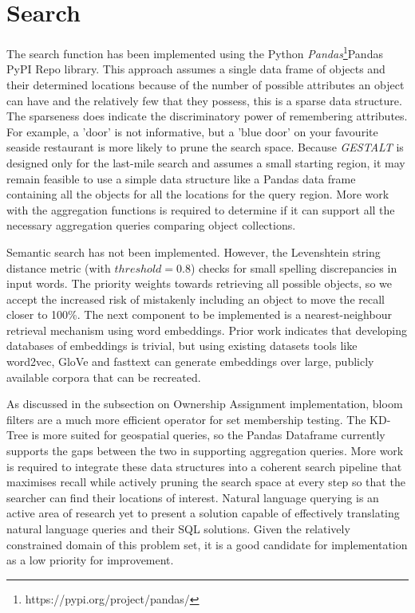 \section{Search}
\label{section:search}

The search function has been implemented using the Python \textit{Pandas}\footnote{https://pypi.org/project/pandas/}{Pandas PyPI Repo} library. 
This approach assumes a single data frame of objects and their determined locations because of the number of possible attributes an object can have and the relatively few that they possess, this is a sparse data structure. 
The sparseness does indicate the discriminatory power of remembering attributes. For example, a 'door' is not informative, but a 'blue door' on your favourite seaside restaurant is more likely to prune the search space. 
Because \textit{GESTALT} is designed only for the last-mile search and assumes a small starting region, it may remain feasible to use a simple data structure like a Pandas data frame containing all the objects for all the locations for the query region. 
More work with the aggregation functions is required to determine if it can support all the necessary aggregation queries comparing object collections. 

Semantic search has not been implemented. However, the Levenshtein string distance metric (with $threshold = 0.8$) checks for small spelling discrepancies in input words. The priority weights towards retrieving all possible objects, so we accept the increased risk of mistakenly including an object to move the recall closer to 100\%. The next component to be implemented is a nearest-neighbour retrieval mechanism using word embeddings. Prior work indicates that developing databases of embeddings is trivial\cite{Mueller2012}, but using existing datasets tools like word2vec, GloVe and fasttext can generate embeddings over large, publicly available corpora that can be recreated. 

As discussed in the subsection on Ownership Assignment implementation, bloom filters are a much more efficient operator for set membership testing. 
The KD-Tree is more suited for geospatial queries, so the Pandas Dataframe currently supports the gaps between the two in supporting aggregation queries. More work is required to integrate these data structures into a coherent search pipeline that maximises recall while actively pruning the search space at every step so that the searcher can find their locations of interest. Natural language querying is an active area of research yet to present a solution capable of effectively translating natural language queries and their SQL solutions. Given the relatively constrained domain of this problem set, it is a good candidate for implementation as a low priority for improvement. 


